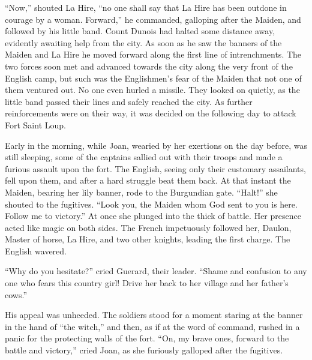 ``Now,'' shouted La Hire, ``no one shall say that La Hire has been
outdone in courage by a woman. Forward,'' he commanded, galloping after
the Maiden, and followed by his little band. Count Dunois had halted
some distance away, evidently awaiting help from the city. As soon as he
saw the banners of the Maiden and La Hire he moved forward along the
first line of intrenchments. The two forces soon met and advanced
towards the city along the very front of the English camp, but such was
the Englishmen's fear of the Maiden that not one of them ventured out.
No one even hurled a missile. They looked on quietly, as the little band
passed their lines and safely reached the city. As further
reinforcements were on their way, it was decided on the following day to
attack Fort Saint Loup.

Early in the morning, while Joan, wearied by her exertions on the day
before, was still sleeping, some of the captains sallied out with their
troops and made a furious assault upon the fort. The English, seeing
only their customary assailants, fell upon them, and after a hard
struggle beat them back. At that instant the Maiden, bearing her lily
banner, rode to the Burgundian gate. ``Halt!'' she shouted to the
fugitives. ``Look you, the Maiden whom God sent to you is here. Follow
me to victory.'' At once she plunged into the thick of battle. Her
presence acted like magic on both sides. The French impetuously followed
her, Daulon, Master of horse, La Hire, and two other knights, leading
the first charge. The English wavered.

``Why do you hesitate?'' cried Guerard, their leader. ``Shame and
confusion to any one who fears this country girl! Drive her back to her
village and her father's cows.''

His appeal was unheeded. The soldiers stood for a moment staring at the
banner in the hand of ``the witch,'' and then, as if at the word of
command, rushed in a panic for the protecting walls of the fort. ``On,
my brave ones, forward to the battle and victory,'' cried Joan, as she
furiously galloped after the fugitives.

